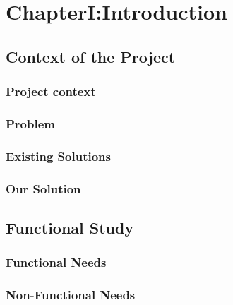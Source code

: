 \section{ChapterI:Introduction}

\subsection{Context of the Project}
\subsubsection{Project context}
\subsubsection{Problem}
\subsubsection{Existing Solutions}
\subsubsection{Our Solution}
\subsection{Functional Study}

\subsubsection{Functional Needs}
\subsubsection{Non-Functional Needs}



